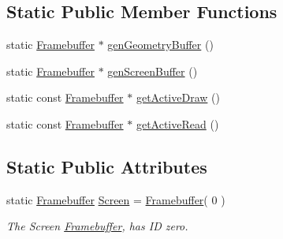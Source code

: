 \subsection*{Static Public Member Functions}
\begin{DoxyCompactItemize}
\item 
static \hyperlink{class_framebuffer}{Framebuffer} $\ast$ \hyperlink{class_framebuffer_add4c1f7b2a3eb1eb007c297b0ac0d88d}{gen\+Geometry\+Buffer} ()
\item 
static \hyperlink{class_framebuffer}{Framebuffer} $\ast$ \hyperlink{class_framebuffer_a6df15a90817f9f0b364d8a9c2050f481}{gen\+Screen\+Buffer} ()
\item 
static const \hyperlink{class_framebuffer}{Framebuffer} $\ast$ \hyperlink{class_framebuffer_ae6fe9b975e5a186087fcb53bcfbf7a9d}{get\+Active\+Draw} ()
\item 
static const \hyperlink{class_framebuffer}{Framebuffer} $\ast$ \hyperlink{class_framebuffer_a0871301296352207df787148de752a21}{get\+Active\+Read} ()
\end{DoxyCompactItemize}
\subsection*{Static Public Attributes}
\begin{DoxyCompactItemize}
\item 
\hypertarget{class_framebuffer_a0a8040e6caa0d5c207ccae24a99f89ce}{}static \hyperlink{class_framebuffer}{Framebuffer} \hyperlink{class_framebuffer_a0a8040e6caa0d5c207ccae24a99f89ce}{Screen} = \hyperlink{class_framebuffer}{Framebuffer}( 0 )\label{class_framebuffer_a0a8040e6caa0d5c207ccae24a99f89ce}

\begin{DoxyCompactList}\small\item\em The Screen \hyperlink{class_framebuffer}{Framebuffer}, has I\+D zero. \end{DoxyCompactList}\end{DoxyCompactItemize}
